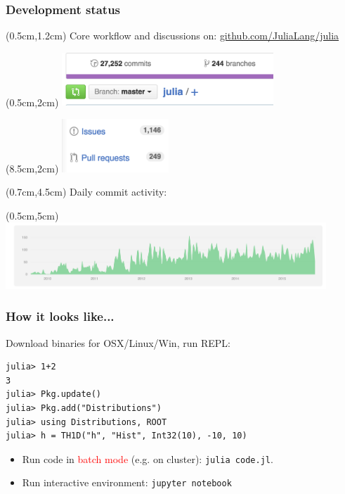 \documentclass[16pt]{beamer}
\begin{document}
\begin{frame}[fragile]
  \frametitle{Development status}
    \begin{textblock*}{10cm}(0.5cm,1.2cm)
    Core workflow and discussions on:
    \href{https://github.com/JuliaLang/julia/}{github.com/JuliaLang/julia}
    \end{textblock*}
  \begin{textblock*}{5cm}(0.5cm,2cm) %
    \includegraphics[height=2cm]{commits.png}
  \end{textblock*}
  \begin{textblock*}{5cm}(8.5cm,2cm) %
    \includegraphics[height=2cm]{issues.png}
  \end{textblock*}
  \begin{textblock*}{10cm}(0.7cm,4.5cm)
    Daily commit activity:
  \end{textblock*}
  \begin{textblock*}{5cm}(0.5cm,5cm) %
    \includegraphics[height=2.5cm]{commits_per_day.png}
  \end{textblock*}
\end{frame}

\begin{frame}[fragile]
  \frametitle{How it looks like...}
  Download binaries for OSX/Linux/Win, run REPL:
  \begin{lstlisting}
julia> 1+2
3
julia> Pkg.update()
julia> Pkg.add("Distributions")
julia> using Distributions, ROOT
julia> h = TH1D("h", "Hist", Int32(10), -10, 10)
  \end{lstlisting}
  \begin{itemize}
    \item Run code in \textcolor{red}{batch mode} (e.g. on cluster): \texttt{julia code.jl}.
    \item Run interactive environment: \texttt{jupyter notebook} 
  \end{itemize}
\end{frame}
\end{document}
